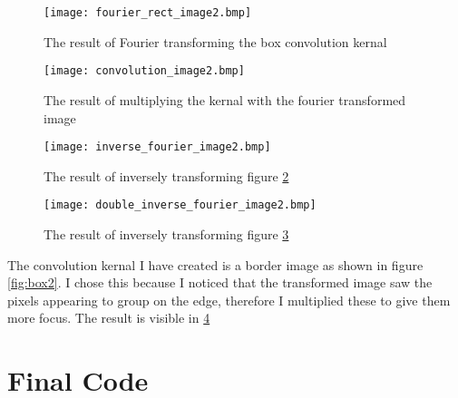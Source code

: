 \documentclass{article}
\begin{document}
\begin{figure}[h]
    \centering
    \caption{The result of Fourier transforming the box convolution kernal}
    \label{fig:fourierBox2}
    \texttt{[image: fourier\_rect\_image2.bmp]}
\end{figure}

\begin{figure}[h]
    \centering
    \caption{The result of multiplying the kernal with the fourier transformed image}
    \label{fig:boxMultiply2}
    \texttt{[image: convolution\_image2.bmp]}
\end{figure}

\begin{figure}[h]
    \centering
    \caption{The result of inversely transforming figure \ref{fig:boxMultiply2}}
    \label{fig:fourierMultiply2}
    \texttt{[image: inverse\_fourier\_image2.bmp]}
\end{figure}

\begin{figure}[h]
    \centering
    \caption{The result of inversely transforming figure \ref{fig:fourierMultiply2}}
    \label{fig:fourierTransformFinal}
    \texttt{[image: double\_inverse\_fourier\_image2.bmp]}
\end{figure}

The convolution kernal I have created is a border image as shown in figure \ref{fig:box2}. I chose this because I noticed that the transformed image saw the pixels appearing to group on the edge, therefore I multiplied these to give them more focus. The result is visible in \ref{fig:fourierTransformFinal}

\pagebreak

\section{Final Code}



\pagebreak

\printbibliography
\end{document}

